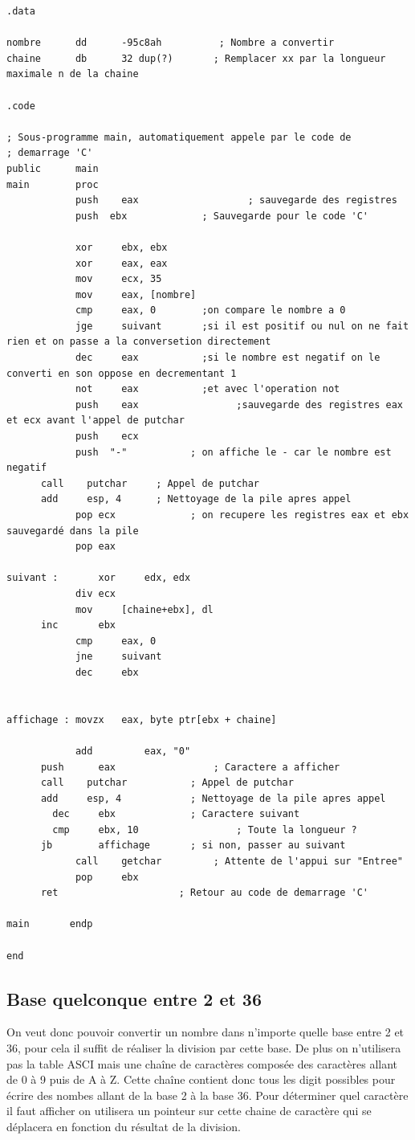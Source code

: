\documentclass[11pt]{report}
\begin{document}
\begin{lstlisting}
.data

nombre      dd      -95c8ah          ; Nombre a convertir
chaine      db      32 dup(?)       ; Remplacer xx par la longueur maximale n de la chaine

.code

; Sous-programme main, automatiquement appele par le code de
; demarrage 'C'
public      main
main        proc
			push 	eax				      ; sauvegarde des registres
			push  ebx             ; Sauvegarde pour le code 'C'

			xor		ebx, ebx
			xor		eax, eax
			mov		ecx, 35
			mov		eax, [nombre]
			cmp 	eax, 0        ;on compare le nombre a 0
			jge 	suivant       ;si il est positif ou nul on ne fait rien et on passe a la conversetion directement
			dec 	eax           ;si le nombre est negatif on le converti en son oppose en decrementant 1
			not 	eax           ;et avec l'operation not
			push 	eax				    ;sauvegarde des registres eax et ecx avant l'appel de putchar
			push	ecx
			push  "-"           ; on affiche le - car le nombre est negatif
      call    putchar     ; Appel de putchar
      add     esp, 4      ; Nettoyage de la pile apres appel
			pop ecx             ; on recupere les registres eax et ebx sauvegardé dans la pile
			pop eax

suivant :		xor 	edx, edx
			div	ecx
			mov		[chaine+ebx], dl
      inc		ebx
			cmp		eax, 0
			jne		suivant
			dec		ebx


affichage : movzx   eax, byte ptr[ebx + chaine]

			add			eax, "0"
      push   	eax         		; Caractere a afficher
      call    putchar     		; Appel de putchar
      add     esp, 4      		; Nettoyage de la pile apres appel
  		dec     ebx             ; Caractere suivant
	    cmp     ebx, 10 				; Toute la longueur ?
      jb     	affichage       ; si non, passer au suivant
			call    getchar         ; Attente de l'appui sur "Entree"
			pop     ebx
      ret                     ; Retour au code de demarrage 'C'

main       endp

end
\end{lstlisting}
\subsection{Base quelconque entre 2 et 36}


On veut donc pouvoir convertir un nombre dans n'importe quelle base entre 2 et 36,
pour cela il suffit de réaliser la division par cette base.
De plus on n'utilisera pas la table ASCI mais une chaîne de caractères composée des caractères allant de 0 à 9 puis de A à Z.
Cette chaîne contient donc tous les digit possibles pour écrire des nombes allant de la base 2 à la base 36.
Pour déterminer quel caractère il faut afficher on utilisera un pointeur
sur cette chaine de caractère qui se déplacera en fonction du résultat de la division.
\end{document}
